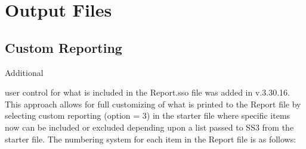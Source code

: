 \section{Output Files}

\subsection{Custom Reporting}
\hypertarget{custom}{Additional} user control for what is included in the Report.sso file was added in v.3.30.16.  This approach allows for full customizing of what is printed to the Report file by selecting custom reporting (option = 3) in the starter file where specific items now can be included or excluded depending upon a list passed to SS3 from the starter file.  The numbering system for each item in the Report file is as follows:

